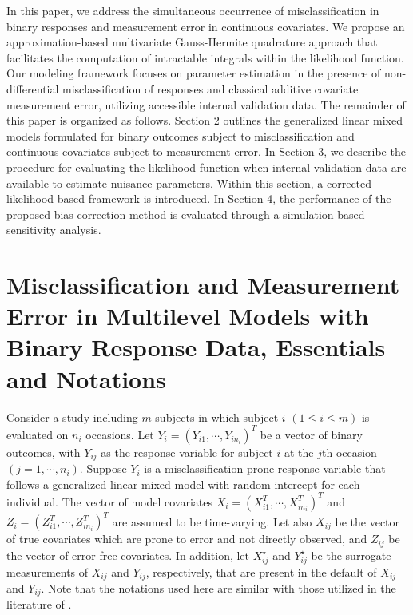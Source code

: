 \documentclass[twoside]{article}
\begin{document}
In this paper, we address the simultaneous occurrence of misclassification in binary responses and measurement error in continuous covariates. We propose an approximation-based multivariate Gauss-Hermite quadrature approach that facilitates the computation of intractable integrals within the likelihood function. Our modeling framework focuses on parameter estimation in the presence of non-differential misclassification of responses and classical additive covariate measurement error, utilizing accessible internal validation data. The remainder of this paper is organized as follows. Section 2 outlines the generalized linear mixed models formulated for binary outcomes subject to misclassification and continuous covariates subject to measurement error. In Section 3, we describe the procedure for evaluating the likelihood function when internal validation data are available to estimate nuisance parameters. Within this section, a corrected likelihood-based framework is introduced. In Section 4, the performance of the proposed bias-correction method is evaluated through a simulation-based sensitivity analysis. 
 \section{Misclassification and Measurement Error in Multilevel Models with Binary Response Data, Essentials and Notations}
Consider a study including $m$ subjects in which subject $i$ $(1\leq i \leq m)$ is evaluated on $n_i$ occasions. Let $Y_i=(Y_{i1},\cdots,Y_{in_i})^T$ be a vector of binary outcomes, with $Y_{ij}$ as the response variable for subject $i$ at the $j$th occasion $(j=1,\cdots,n_i)$. Suppose $Y_i$ is a misclassification-prone response variable that follows a generalized linear mixed model with random intercept for each individual. The vector of model covariates $X_i=(X_{i1}^T,\cdots,X_{in_i}^T)^T$ and  $Z_i=(Z_{i1}^T,\cdots,Z_{in_i}^T)^T$ are assumed to be time-varying. Let also $X_{ij}$ be the vector of true covariates which are prone to error and not directly observed, and $Z_{ij}$ be the vector of error-free covariates. In addition, let $X_{ij}^{\star}$ and $Y_{ij}^{\star} $ be the surrogate measurements of $X_{ij}$ and $Y_{ij}$, respectively, that are present in the default of $X_{ij}$ and $Y_{ij}$. Note that the notations used here are similar with those utilized in the literature of \cite{Yi:2017}.
\end{document}
